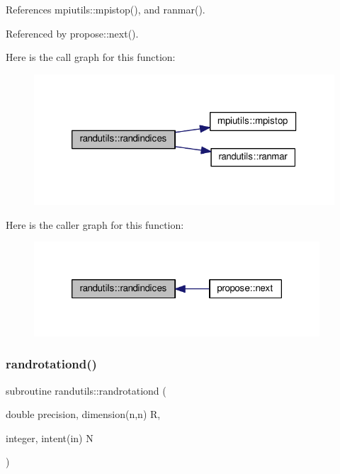 References mpiutils\+::mpistop(), and ranmar().



Referenced by propose\+::next().

Here is the call graph for this function\+:
\nopagebreak
\begin{figure}[H]
\begin{center}
\leavevmode
\includegraphics[width=318pt]{namespacerandutils_ad5f2ab70ffa569eab34dede61e38f4a0_cgraph}
\end{center}
\end{figure}
Here is the caller graph for this function\+:
\nopagebreak
\begin{figure}[H]
\begin{center}
\leavevmode
\includegraphics[width=302pt]{namespacerandutils_ad5f2ab70ffa569eab34dede61e38f4a0_icgraph}
\end{center}
\end{figure}
\mbox{\label{namespacerandutils_a2231f6417e95a0e41e8f024aaa89445f}} 
\subsubsection{\texorpdfstring{randrotationd()}{randrotationd()}}
{\footnotesize\ttfamily subroutine randutils\+::randrotationd (\begin{DoxyParamCaption}\item[{double precision, dimension(n,n)}]{R,  }\item[{integer, intent(in)}]{N }\end{DoxyParamCaption})}



